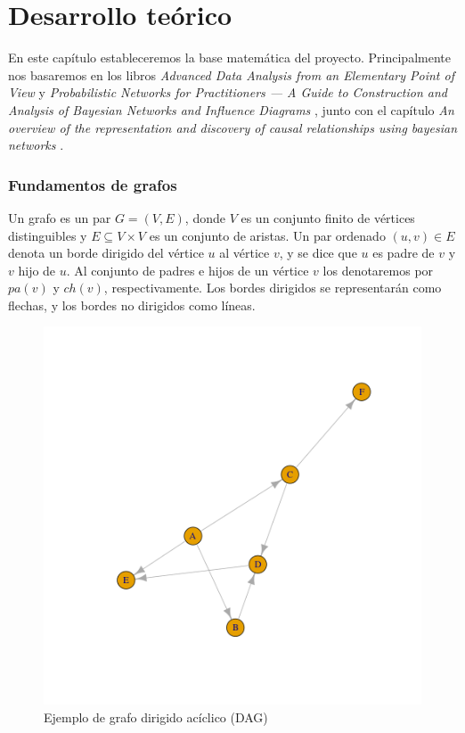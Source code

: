 \chapter{Desarrollo teórico}
En este capítulo estableceremos la base matemática del proyecto. Principalmente nos basaremos en 
los libros \textit{Advanced Data Analysis
from an Elementary Point of View} \cite{ada} y \textit{Probabilistic Networks for Practitioners — A
Guide to Construction and Analysis of Bayesian
Networks and Influence Diagrams} \cite{pgm}, junto con el capítulo \textit{An overview of the representation and 
discovery of causal relationships using bayesian networks} \cite{cooper}.

\subsection{Fundamentos de grafos}
Un grafo es un par $G = (V, E)$, donde $V$ es un conjunto finito de vértices distinguibles y 
$E \subseteq V \times V$ es un conjunto de aristas. Un par ordenado $(u, v) \in E$ denota un borde dirigido
del vértice $u$ al vértice $v$, y se dice que $u$ es padre de $v$ y $v$ hijo de $u$. Al conjunto de padres 
e hijos de un vértice $v$ los denotaremos por $pa(v)$ y $ch(v)$, respectivamente. Los bordes dirigidos 
se representarán como flechas, y los bordes no dirigidos como líneas. 

\begin{figure}[h!]
    \centering
     \includegraphics[width=\textwidth]{./img/dag.png}
     \caption{Ejemplo de grafo dirigido acíclico (DAG)}
     \label{img:dag1}
    \end{figure}

